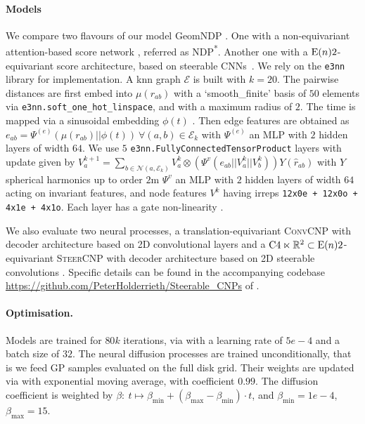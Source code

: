 \paragraph{Models}
We compare two flavours of our model GeomNDP \!
\!.
One with a non-equivariant attention-based score network \parencite[Figure C.1,][]{dutordoir2022Neural}, referred as {\scshape NDP\textsuperscript{*}}.
Another one with a $\mathrm{E}(n){2}$-equivariant score architecture, based on steerable CNNs~\parencite{thomas2018tensor,weiler20183Da}.
We rely on the \texttt{e3nn} library \parencite{e3nn_paper} for implementation.
A knn graph $\mathcal{E}$ is built with $k=20$.
The pairwise distances are first embed into $\mu(r_{ab})$ with a `smooth\_finite' basis of $50$ elements via \texttt{e3nn.soft\_one\_hot\_linspace}, and with a maximum radius of $2$.
The time is mapped via a sinusoidal embedding $\phi(t)$ \parencite{vaswani2017attention}.
Then edge features are obtained as $e_{ab} = \Psi^{(e)}(\mu(r_{ab})||\phi(t)) \ \forall (a, b) \in \mathcal{E}_k$ with $\Psi^{(e)}$ an MLP with $2$ hidden layers of width $64$.
We use $5$ \texttt{e3nn.FullyConnectedTensorProduct} layers with update given by $V_a^{k+1} = \sum_{b \in \mathcal{N}(a, \mathcal{E}_k)} V_a^{k} \otimes \left(\Psi^{v}(e_{ab}||V_a^k||V_b^k)\right) Y(\hat{r}_{ab})$ with $Y$ spherical harmonics up to order $2$m $\Psi^{v}$ an MLP with $2$ hidden layers of width $64$ acting on invariant features, and node features $V^k$ having irreps \texttt{12x0e + 12x0o + 4x1e + 4x1o}.
Each layer has a gate non-linearity \parencite{weiler20183Da}.

We also evaluate two neural processes, a translation-equivariant {\scshape ConvCNP} \parencite{gordon2019Convolutional} with decoder architecture based on 2D convolutional layers \parencite{lecungradient1998} and a $\mathrm{C}4 \ltimes \mathbb{R}^2 \subset \mathrm{E}(n){2}$-equivariant {\scshape SteerCNP} \parencite{holderrieth2021equivariant} with decoder architecture based on 2D steerable convolutions \parencite{weiler2021General}.
Specific details can be found in the accompanying codebase \url{https://github.com/PeterHolderrieth/Steerable_CNPs} of \textcite{holderrieth2021equivariant}.

\paragraph{Optimisation.}
Models are trained for $80k$ iterations, via \parencite{kingma2015Adam} with a learning rate of $5e-4$ and a batch size of $32$.
The neural diffusion processes are trained unconditionally, that is we feed GP samples evaluated on the full disk grid.
Their weights are updated via with exponential moving average, with coefficient $0.99$.
The diffusion coefficient is weighted by $\beta: \ t \mapsto \beta_{\min} + (\beta_{\max} - \beta_{\min}) \cdot t$, and $\beta_{\min}= 1e-4$, $\beta_{\max} = 15$.

